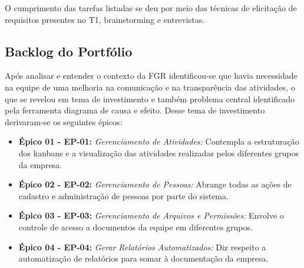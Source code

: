 O cumprimento das tarefas listadas se deu por meio das técnicas de elicitação de requisitos presentes no T1,
 brainstorming e entrevistas.

\subsection{Backlog do Portfólio}

Após analisar e entender o contexto da FGR identificou-se que havia necessidade na equipe de uma melhoria na comunicação
 e na transparência das atividades, o que se revelou em tema de investimento e também problema central identificado pela
  ferramenta diagrama de causa e efeito. Desse tema de investimento derivaram-se os seguintes épicos:

\begin{itemize}
  \item \textbf{Épico 01 - EP-01:} \textit{Gerenciamento de Atividades:} Contempla a estruturação dos kanbans e a visualização das atividades realizadas pelos diferentes grupos da empresa.
  \item \textbf{Épico 02 - EP-02:} \textit{Gerenciamento de Pessoas:} Abrange todas as ações de cadastro e administração de pessoas por parte do sistema.
  \item \textbf{Épico 03 - EP-03:} \textit{Gerenciamento de Arquivos e Permissões:} Envolve o controle de acesso a documentos da equipe em diferentes grupos.
  \item \textbf{Épico 04 - EP-04:} \textit{Gerar Relatórios Automatizados:} Diz respeito a automatização de relatórios para somar à documentação da empresa.
\end{itemize}
